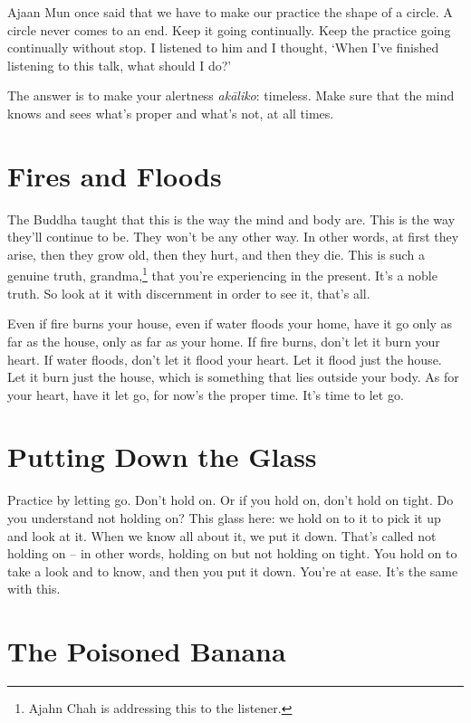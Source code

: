 Ajaan Mun once said that we have to make our practice the shape of a circle. A circle never comes to an end. Keep it going continually. Keep the practice going continually without stop. I listened to him and I thought, `When I've finished listening to this talk, what should I do?'

The answer is to make your alertness \textit{ak\=aliko}: timeless. Make sure that the mind knows and sees what's proper and what's not, at all times.

\clearpage

\section{Fires and Floods}

The Buddha taught that this is the way the mind and body are. This is the way they'll continue to be. They won't be any other way. In other words, at first they arise, then they grow old, then they hurt, and then they die. This is such a genuine truth, grandma,\footnote{Ajahn Chah is addressing this to the listener.} that you're experiencing in the present. It's a noble truth. So look at it with discernment in order to see it, that's all.

Even if fire burns your house, even if water floods your home, have it go only as far as the house, only as far as your home. If fire burns, don't let it burn your heart. If water floods, don't let it flood your heart. Let it flood just the house. Let it burn just the house, which is something that lies outside your body. As for your heart, have it let go, for now's the proper time. It's time to let go.

\vspace*{-\baselineskip}
\section{Putting Down the Glass}

Practice by letting go. Don't hold on. Or if you hold on, don't hold on tight. Do you understand not holding on? This glass here: we hold on to it to pick it up and look at it. When we know all about it, we put it down. That's called not holding on -- in other words, holding on but not holding on tight. You hold on to take a look and to know, and then you put it down. You're at ease. It's the same with this.

\clearpage

\section{The Poisoned Banana}

